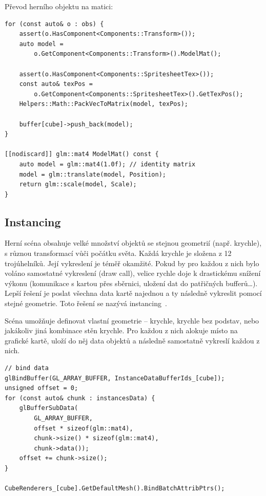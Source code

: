\documentclass[thesis=M,czech]{FITthesis}[2019/12/23]
\begin{document}

Převod herního objektu na matici:

\begin{verbatim}
for (const auto& o : obs) {
    assert(o.HasComponent<Components::Transform>());
    auto model =
        o.GetComponent<Components::Transform>().ModelMat();

    assert(o.HasComponent<Components::SpritesheetTex>());
    const auto& texPos = 
        o.GetComponent<Components::SpritesheetTex>().GetTexPos();
    Helpers::Math::PackVecToMatrix(model, texPos);

    buffer[cube]->push_back(model);
}

[[nodiscard]] glm::mat4 ModelMat() const {
    auto model = glm::mat4(1.0f); // identity matrix
    model = glm::translate(model, Position);
    return glm::scale(model, Scale);
}
\end{verbatim}

\subsection{Instancing}

Herní scéna obsahuje velké množství objektů se stejnou geometrií (např. krychle), s různou transformací vůči počátku světa. Každá krychle je složena z 12 trojúhelníků. Její vykreslení je téměř okamžité. Pokud by pro každou z nich bylo voláno samostatné vykreslení (draw call), velice rychle doje k drastickému snížení výkonu (komunikace s kartou přes sběrnici, uložení dat do patřičných bufferů\dots). Lepší řešení je poslat všechna data kartě najednou a ty následně vykreslit pomocí stejné geometrie. Toto řešení se nazývá instancing~\cite{lopgl_instancing}.

Scéna umožňuje definovat vlastní geometrie -- krychle, krychle bez podstav, nebo jakákoliv jiná kombinace stěn krychle. Pro každou z nich alokuje místo na grafické kartě, uloží do něj data objektů a následně samostatně vykreslí každou z nich.

\begin{verbatim}
// bind data
glBindBuffer(GL_ARRAY_BUFFER, InstanceDataBufferIds_[cube]);
unsigned offset = 0;
for (const auto& chunk : instancesData) {
    glBufferSubData(
        GL_ARRAY_BUFFER,
        offset * sizeof(glm::mat4), 
        chunk->size() * sizeof(glm::mat4), 
        chunk->data());
    offset += chunk->size();
}

CubeRenderers_[cube].GetDefaultMesh().BindBatchAttribPtrs();
\end{verbatim}
\end{document}
